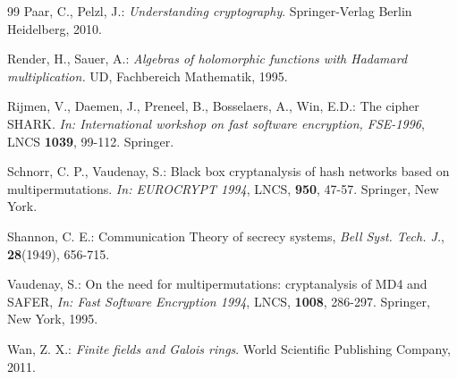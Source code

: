 \documentclass[12pt]{article}
\begin{document}
\begin{thebibliography}{99}
	Paar, C.,  Pelzl, J.: \textit{Understanding cryptography}. Springer-Verlag Berlin Heidelberg, 2010.

Render, H., Sauer, A.: \textit{Algebras of holomorphic functions with Hadamard multiplication.} UD, Fachbereich Mathematik, 1995.

  Rijmen, V., Daemen, J., Preneel, B., Bosselaers, A., Win, E.D.: The cipher SHARK. \textit{In: International workshop on fast software encryption, FSE-1996}, LNCS \textbf{1039}, 99-112. Springer.


Schnorr, C. P., Vaudenay, S.: Black box cryptanalysis of hash networks based on multipermutations. \textit{In:
	EUROCRYPT 1994}, LNCS, \textbf{950}, 47-57. Springer, New York.
	
Shannon, C. E.: Communication Theory of secrecy systems, \textit{Bell Syst. Tech. J.}, \textbf{28}(1949), 656-715.

Vaudenay, S.: On the need for multipermutations: cryptanalysis of MD4 and SAFER, \textit{In: Fast Software
	Encryption 1994}, LNCS, \textbf{1008}, 286-297. Springer, New York, 1995.
	
	 Wan, Z. X.: \textit{Finite fields and Galois rings}. World Scientific Publishing Company, 2011.
	

\end{thebibliography}
\end{document}
